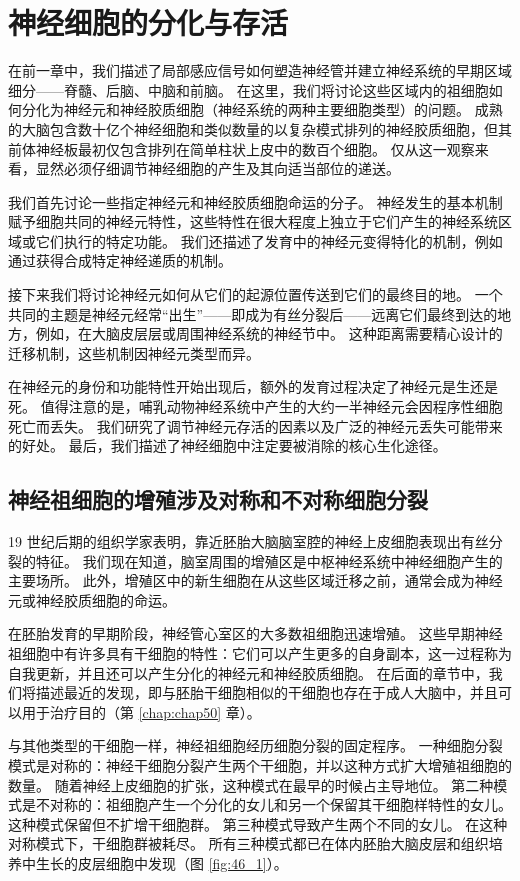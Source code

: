 \chapter{神经细胞的分化与存活} \label{chap:chap46}
在前一章中，我们描述了局部感应信号如何塑造神经管并建立神经系统的早期区域细分——脊髓、后脑、中脑和前脑。 在这里，我们将讨论这些区域内的祖细胞如何分化为神经元和神经胶质细胞（神经系统的两种主要细胞类型）的问题。 成熟的大脑包含数十亿个神经细胞和类似数量的以复杂模式排列的神经胶质细胞，但其前体神经板最初仅包含排列在简单柱状上皮中的数百个细胞。 仅从这一观察来看，显然必须仔细调节神经细胞的产生及其向适当部位的递送。

我们首先讨论一些指定神经元和神经胶质细胞命运的分子。 神经发生的基本机制赋予细胞共同的神经元特性，这些特性在很大程度上独立于它们产生的神经系统区域或它们执行的特定功能。 我们还描述了发育中的神经元变得特化的机制，例如通过获得合成特定神经递质的机制。

接下来我们将讨论神经元如何从它们的起源位置传送到它们的最终目的地。 一个共同的主题是神经元经常“出生”——即成为有丝分裂后——远离它们最终到达的地方，例如，在大脑皮层层或周围神经系统的神经节中。 这种距离需要精心设计的迁移机制，这些机制因神经元类型而异。

在神经元的身份和功能特性开始出现后，额外的发育过程决定了神经元是生还是死。 值得注意的是，哺乳动物神经系统中产生的大约一半神经元会因程序性细胞死亡而丢失。 我们研究了调节神经元存活的因素以及广泛的神经元丢失可能带来的好处。 最后，我们描述了神经细胞中注定要被消除的核心生化途径。

\section{神经祖细胞的增殖涉及对称和不对称细胞分裂}
19 世纪后期的组织学家表明，靠近胚胎大脑脑室腔的神经上皮细胞表现出有丝分裂的特征。 我们现在知道，脑室周围的增殖区是中枢神经系统中神经细胞产生的主要场所。 此外，增殖区中的新生细胞在从这些区域迁移之前，通常会成为神经元或神经胶质细胞的命运。

在胚胎发育的早期阶段，神经管心室区的大多数祖细胞迅速增殖。 这些早期神经祖细胞中有许多具有干细胞的特性：它们可以产生更多的自身副本，这一过程称为自我更新，并且还可以产生分化的神经元和神经胶质细胞。 在后面的章节中，我们将描述最近的发现，即与胚胎干细胞相似的干细胞也存在于成人大脑中，并且可以用于治疗目的（第 \ref{chap:chap50} 章）。

与其他类型的干细胞一样，神经祖细胞经历细胞分裂的固定程序。 一种细胞分裂模式是对称的：神经干细胞分裂产生两个干细胞，并以这种方式扩大增殖祖细胞的数量。 随着神经上皮细胞的扩张，这种模式在最早的时候占主导地位。 第二种模式是不对称的：祖细胞产生一个分化的女儿和另一个保留其干细胞样特性的女儿。 这种模式保留但不扩增干细胞群。 第三种模式导致产生两个不同的女儿。 在这种对称模式下，干细胞群被耗尽。 
所有三种模式都已在体内胚胎大脑皮层和组织培养中生长的皮层细胞中发现（图 \ref{fig:46_1}）。

